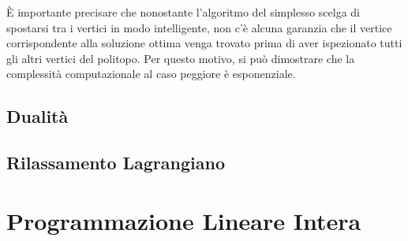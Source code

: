 \`E importante precisare che nonostante l'algoritmo del simplesso scelga di spostarsi tra i vertici in modo
intelligente, non c'è alcuna garanzia che il vertice corrispondente alla soluzione ottima venga trovato prima di aver
ispezionato tutti gli altri vertici del politopo. Per questo motivo, si può dimostrare che la complessità computazionale
al caso peggiore è esponenziale.


\subsection{Dualità}

\subsection{Rilassamento Lagrangiano}

\section{Programmazione Lineare Intera}
